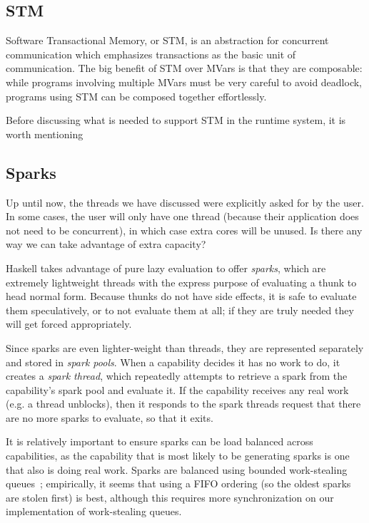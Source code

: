 \subsection{STM}

Software Transactional Memory, or STM, is an abstraction for concurrent
communication which emphasizes transactions as the basic unit of
communication.  The big benefit of STM over MVars is that they are
composable: while programs involving multiple MVars must be very careful
to avoid deadlock, programs using STM can be composed together
effortlessly.

Before discussing what is needed to support STM in the runtime system,
it is worth mentioning 

\subsection{Sparks}

Up until now, the threads we have discussed were explicitly asked for
by the user.  In some cases, the user will only have one thread (because
their application does not need to be concurrent), in which case extra
cores will be unused.  Is there any way we can take advantage of extra
capacity?

Haskell takes advantage of pure lazy evaluation to offer \emph{sparks},
which are extremely lightweight threads with the express purpose of
evaluating a thunk to head normal form.  Because thunks do not have
side effects, it is safe to evaluate them speculatively, or to not
evaluate them at all; if they are truly needed they will get forced
appropriately.

Since sparks are even lighter-weight than threads, they are represented
separately and stored in \emph{spark pools}.  When a capability decides
it has no work to do, it creates a \emph{spark thread}, which repeatedly
attempts to retrieve a spark from the capability's spark pool and
evaluate it.  If the capability receives any real work (e.g. a thread
unblocks), then it responds to the spark threads request that there are no
more sparks to evaluate, so that it exits.

It is relatively important to ensure sparks can be load balanced across
capabilities, as the capability that is most likely to be generating
sparks is one that also is doing real work.  Sparks are balanced using
bounded work-stealing queues~\XXX; empirically, it seems that using a FIFO
ordering (so the oldest sparks are stolen first) is best, although this
requires more synchronization on our implementation of work-stealing
queues.

